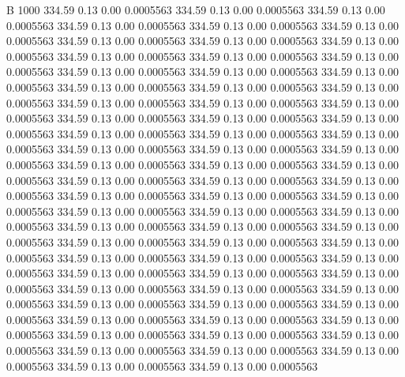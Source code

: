 


B 1000
 334.59    0.13    0.00   0.0005563
 334.59    0.13    0.00   0.0005563
 334.59    0.13    0.00   0.0005563
 334.59    0.13    0.00   0.0005563
 334.59    0.13    0.00   0.0005563
 334.59    0.13    0.00   0.0005563
 334.59    0.13    0.00   0.0005563
 334.59    0.13    0.00   0.0005563
 334.59    0.13    0.00   0.0005563
 334.59    0.13    0.00   0.0005563
 334.59    0.13    0.00   0.0005563
 334.59    0.13    0.00   0.0005563
 334.59    0.13    0.00   0.0005563
 334.59    0.13    0.00   0.0005563
 334.59    0.13    0.00   0.0005563
 334.59    0.13    0.00   0.0005563
 334.59    0.13    0.00   0.0005563
 334.59    0.13    0.00   0.0005563
 334.59    0.13    0.00   0.0005563
 334.59    0.13    0.00   0.0005563
 334.59    0.13    0.00   0.0005563
 334.59    0.13    0.00   0.0005563
 334.59    0.13    0.00   0.0005563
 334.59    0.13    0.00   0.0005563
 334.59    0.13    0.00   0.0005563
 334.59    0.13    0.00   0.0005563
 334.59    0.13    0.00   0.0005563
 334.59    0.13    0.00   0.0005563
 334.59    0.13    0.00   0.0005563
 334.59    0.13    0.00   0.0005563
 334.59    0.13    0.00   0.0005563
 334.59    0.13    0.00   0.0005563
 334.59    0.13    0.00   0.0005563
 334.59    0.13    0.00   0.0005563
 334.59    0.13    0.00   0.0005563
 334.59    0.13    0.00   0.0005563
 334.59    0.13    0.00   0.0005563
 334.59    0.13    0.00   0.0005563
 334.59    0.13    0.00   0.0005563
 334.59    0.13    0.00   0.0005563
 334.59    0.13    0.00   0.0005563
 334.59    0.13    0.00   0.0005563
 334.59    0.13    0.00   0.0005563
 334.59    0.13    0.00   0.0005563
 334.59    0.13    0.00   0.0005563
 334.59    0.13    0.00   0.0005563
 334.59    0.13    0.00   0.0005563
 334.59    0.13    0.00   0.0005563
 334.59    0.13    0.00   0.0005563
 334.59    0.13    0.00   0.0005563
 334.59    0.13    0.00   0.0005563
 334.59    0.13    0.00   0.0005563
 334.59    0.13    0.00   0.0005563
 334.59    0.13    0.00   0.0005563
 334.59    0.13    0.00   0.0005563
 334.59    0.13    0.00   0.0005563
 334.59    0.13    0.00   0.0005563
 334.59    0.13    0.00   0.0005563
 334.59    0.13    0.00   0.0005563
 334.59    0.13    0.00   0.0005563
 334.59    0.13    0.00   0.0005563
 334.59    0.13    0.00   0.0005563
 334.59    0.13    0.00   0.0005563
 334.59    0.13    0.00   0.0005563
 334.59    0.13    0.00   0.0005563
 334.59    0.13    0.00   0.0005563
 334.59    0.13    0.00   0.0005563
 334.59    0.13    0.00   0.0005563
 334.59    0.13    0.00   0.0005563
 334.59    0.13    0.00   0.0005563
 334.59    0.13    0.00   0.0005563
